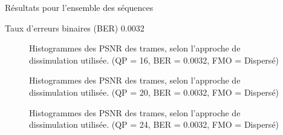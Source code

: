 \begin{section}{Résultats pour l'ensemble des séquences}
\begin{subsection}{Taux d'erreurs binaires (BER) 0.0032}
\begin{figure} 
\caption[]{Histogrammes des PSNR des trames, selon l'approche de dissimulation
utilisée. (QP = 16, BER = 0.0032, FMO = Dispersé)}
\label{fig-HistAllDispersed16x32}
\end{figure}

\begin{figure} 
\caption[]{Histogrammes des PSNR des trames, selon l'approche de dissimulation
utilisée. (QP = 20, BER = 0.0032, FMO = Dispersé)}
\label{fig-HistAllDispersed20x32}
\end{figure}

\begin{figure} 
\caption[]{Histogrammes des PSNR des trames, selon l'approche de dissimulation
utilisée. (QP = 24, BER = 0.0032, FMO = Dispersé)}
\label{fig-HistAllDispersed24x32}
\end{figure}


\end{subsection}
\end{section}
